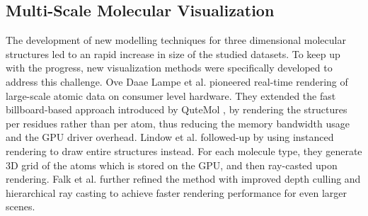 \documentclass[review,journal]{vgtc}         %
\begin{document}

\subsection{Multi-Scale Molecular Visualization}

The development of new modelling techniques for three dimensional molecular structures led to an rapid increase in size of the studied datasets.
To keep up with the progress, new visualization methods were specifically developed to address this challenge.
Ove Daae Lampe et al.\cite{lampe2007two} pioneered real-time rendering of large-scale atomic data on consumer level hardware. 
They extended the fast billboard-based approach introduced by QuteMol \cite{tarini2006ambient}, by rendering the structures per residues rather than per atom, thus reducing the memory bandwidth usage and the GPU driver overhead. 
Lindow et al. \cite{lindow2012interactive} followed-up by using  instanced rendering to draw entire structures instead.
For each molecule type, they generate 3D grid of the atoms which is stored on the GPU, and then ray-casted upon rendering.
Falk et al. \cite{falk2013atomistic} further refined the method with improved depth culling and hierarchical ray casting to achieve faster rendering performance for even larger scenes. 
\end{document}
